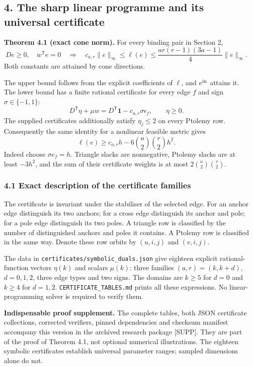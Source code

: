 \documentclass[11pt,a4paper]{article}
\begin{document}
\subsection{4. The sharp linear programme and its universal
certificate}\label{the-sharp-linear-programme-and-its-universal-certificate}

\textbf{Theorem 4.1 (exact cone norm).} For every binding pair in
Section 2, \[De\ge0,\quad w^{\mathsf T}e=0
\quad\Longrightarrow\quad
c_{a,r}\|e\|_\infty\le\ell(e)
\le\frac{ar(r-1)(3a-1)}4\|e\|_\infty.\] Both constants are attained by
cone directions.

The upper bound follows from the explicit coefficients of \(\ell\), and
\(e^{\rm in}\) attains it. The lower bound has a finite rational
certificate for every edge \(f\) and sign \(\sigma\in\{-1,1\}\):
\[\boxed{D^{\mathsf T}\eta+\mu w
=D^{\mathsf T}\mathbf1-c_{a,r}\sigma\epsilon_f,
\qquad\eta\ge0.} \tag{C}\] The supplied certificates additionally
satisfy \(\eta_j\le2\) on every Ptolemy row. Consequently the same
identity for a nonlinear feasible metric gives
\[\boxed{\ell(e)\ge c_{a,r}h
-6\binom a2\binom r2h^2.} \tag{4.1}\] Indeed choose \(\sigma e_f=h\).
Triangle slacks are nonnegative, Ptolemy slacks are at least \(-3h^2\),
and the sum of their certificate weights is at most
\(2\binom a2\binom r2\).

\subsubsection{4.1 Exact description of the certificate
families}\label{exact-description-of-the-certificate-families}

The certificate is invariant under the stabiliser of the selected edge.
For an anchor edge distinguish its two anchors; for a cross edge
distinguish its anchor and pole; for a pole edge distinguish its two
poles. A triangle row is classified by the number of distinguished
anchors and poles it contains. A Ptolemy row is classified in the same
way. Denote these row orbits by \((u,i,j)\) and \((v,i,j)\).

The data in \texttt{certificates/symbolic\_duals.json} give eighteen
explicit rational-function vectors \(\eta(k)\) and scalars \(\mu(k)\):
three families \((a,r)=(k,k+d)\), \(d=0,1,2\), three edge types and two
signs. The domains are \(k\ge5\) for \(d=0\) and \(k\ge4\) for
\(d=1,2\). \texttt{CERTIFICATE\_TABLES.md} prints all these expressions.
No linear-programming solver is required to verify them.

\textbf{Indispensable proof supplement.} The complete tables, both JSON
certificate collections, corrected verifiers, pinned dependencies and
checksum manifest accompany this version in the archived research
package {[}SUPP{]}. They are part of the proof of Theorem 4.1, not
optional numerical illustrations. The eighteen symbolic certificates
establish universal parameter ranges; sampled dimensions alone do not.
\end{document}
